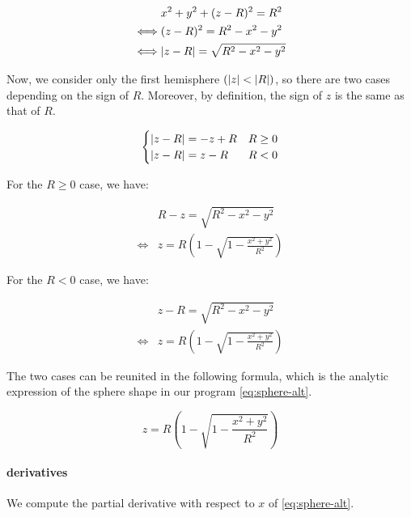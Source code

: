 \begin{equation}
\begin{split}
& x^2 + y^2 + (z - R)^2 = R^2 \\
\iff & (z - R)^2 = R^2 - x^2 - y^2 \\
\iff & \abs{z-R} = \sqrt{R^2 - x^2 - y^2}
\end{split} \end{equation}

Now, we consider only the first hemisphere $(\abs{z} < \abs{R})$, so
there are two cases depending on the sign of $R$. Moreover, by definition,
the sign of $z$ is the same as that of $R$.

\begin{equation} \begin{cases}
\abs{z - R} = -z + R & R \geq 0 \\
\abs{z - R} = z - R & R < 0
\end{cases} \end{equation}

For the $R \geq 0$ case, we have:

\begin{equation} \begin{split}
& R - z = \sqrt{R^2 -x^2 -y^2} \\
\iff & z = R \left( 1 - \sqrt{1 - \frac{x^2 + y^2}{R^2}} \right)
\end{split} \end{equation}

For the $R < 0$ case, we have:

\begin{equation} \begin{split}
& z - R = \sqrt{R^2 -x^2 -y^2} \\
\iff & z = R \left( 1 - \sqrt{1 - \frac{x^2 + y^2}{R^2}} \right)
\end{split} \end{equation}

The two cases can be reunited in the following formula, which is the
analytic expression of the sphere shape in our program \cref{eq:sphere-alt}.

\begin{equation} \label{eq:sphere-alt}
z = R \left( 1 - \sqrt{1 - \frac{x^2 + y^2}{R^2}} \right)
\end{equation}

\paragraph{derivatives}
We compute the partial derivative with respect to $x$ of \cref{eq:sphere-alt}.

